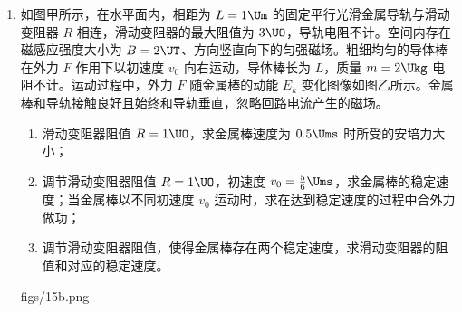 \documentclass[\gkver]{gaokaozhenti}
\begin{document}
\begin{enumerate}
\gknewpage
\item
如图甲所示，在水平面内，相距为 $L=1 \Um$ 的固定平行光滑金属导轨与滑动变阻器 $R$ 相连，滑动变阻器的最大阻值为 $3 \UO$，导轨电阻不计。空间内存在磁感应强度大小为 $B=2 \UT$、方向竖直向下的匀强磁场。粗细均匀的导体棒在外力 $F$ 作用下以初速度 $v_{0}$ 向右运动，导体棒长为 $L$，质量 $m=2 \Ukg$ 电阻不计。运动过程中，外力 $F$ 随金属棒的动能 $E_{k}$ 变化图像如图乙所示。金属棒和导轨接触良好且始终和导轨垂直，忽略回路电流产生的磁场。
\begin{enumerate}
	\item
	滑动变阻器阻值 $R=1 \UO$，求金属棒速度为 $0.5 \Ums$ 时所受的安培力大小；
	\item
	调节滑动变阻器阻值 $R=1 \UO$，初速度 $v_{0}=\frac{5}{6} \Ums$，求金属棒的稳定速度；当金属棒以不同初速度 $v_{0}$ 运动时，求在达到稳定速度的过程中合外力做功；
	\item
	调节滑动变阻器阻值，使得金属棒存在两个稳定速度，求滑动变阻器的阻值和对应的稳定速度。
\end{enumerate}
{figs/15b.png}

\end{enumerate}
\end{document}
